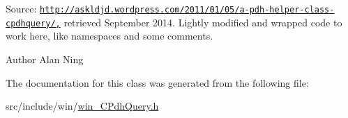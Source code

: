 Source\+: \href{http://askldjd.wordpress.com/2011/01/05/a-pdh-helper-class-cpdhquery/,}{\tt http\+://askldjd.\+wordpress.\+com/2011/01/05/a-\/pdh-\/helper-\/class-\/cpdhquery/,} retrieved September 2014. Lightly modified and wrapped code to work here, like namespaces and some comments. \begin{DoxyAuthor}{Author}
Alan Ning 
\end{DoxyAuthor}


The documentation for this class was generated from the following file\+:\begin{DoxyCompactItemize}
\item 
src/include/win/\hyperlink{win___c_pdh_query_8h}{win\+\_\+\+C\+Pdh\+Query.\+h}\end{DoxyCompactItemize}
